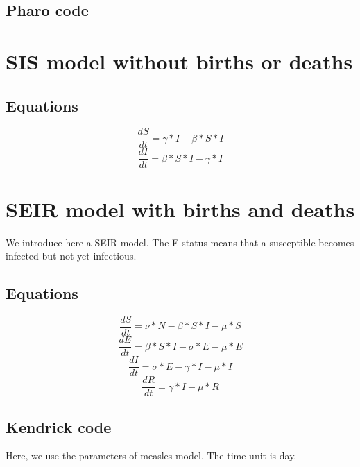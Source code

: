\documentclass[a4paper,10pt,twoside]{book}
\begin{document}
\subsection{ Pharo code}\section{ SIS model without births or deaths}\subsection{Equations}

\begin{equation}
\frac{dS}{dt} = \gamma*I-\beta*S*I
\end{equation}
\begin{equation}
\frac{dI}{dt} = \beta*S*I-\gamma*I
\end{equation}
\section{ SEIR model with births and deaths}
We introduce here a SEIR model. The E status means that a susceptible becomes infected but not yet infectious.
\subsection{Equations}

  \begin{equation}
    \frac{dS}{dt} = \nu*N - \beta*S*I - \mu*S
  \end{equation}
  \begin{equation}
    \frac{dE}{dt} = \beta*S*I - \sigma*E - \mu*E
  \end{equation}
  \begin{equation}
    \frac{dI}{dt} = \sigma*E - \gamma*I - \mu*I
  \end{equation}
  \begin{equation}
    \frac{dR}{dt} = \gamma*I - \mu*R
  \end{equation}
  
\subsection{Kendrick code}
Here, we use the parameters of measles model. The time unit is day.

\end{document}
